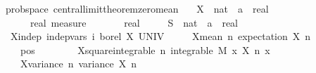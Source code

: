 \documentclass{article}
\begin{document}
\begin{boxB}
\begin{isabelle}
\isamarkupfalse \ {\isacharparenleft}{\kern0pt}\ prob{\isacharunderscore}{\kern0pt}space{\isacharparenright}{\kern0pt}\ central{\isacharunderscore}{\kern0pt}limit{\isacharunderscore}{\kern0pt}theorem{\isacharunderscore}{\kern0pt}zero{\isacharunderscore}{\kern0pt}mean{\isacharcolon}{\kern0pt}\isanewline
\ \ \ X\ {\isacharcolon}{\kern0pt}{\isacharcolon}{\kern0pt}\ {\isachardoublequoteopen}nat\ {\isasymRightarrow}\ {\isacharprime}{\kern0pt}a\ {\isasymRightarrow}\ real{\isachardoublequoteclose}\isanewline
\ \ \ \ \ {\isasymmu}\ {\isacharcolon}{\kern0pt}{\isacharcolon}{\kern0pt}\ {\isachardoublequoteopen}real\ measure{\isachardoublequoteclose}\isanewline
\ \ \ \ \ {\isasymsigma}\ {\isacharcolon}{\kern0pt}{\isacharcolon}{\kern0pt}\ real\isanewline
\ \ \ \ \ S\ {\isacharcolon}{\kern0pt}{\isacharcolon}{\kern0pt}\ {\isachardoublequoteopen}nat\ {\isasymRightarrow}\ {\isacharprime}{\kern0pt}a\ {\isasymRightarrow}\ real{\isachardoublequoteclose}\isanewline
\ \ \ X{\isacharunderscore}{\kern0pt}indep{\isacharcolon}{\kern0pt}\ {\isachardoublequoteopen}indep{\isacharunderscore}{\kern0pt}vars\ {\isacharparenleft}{\kern0pt}{\isasymlambda}i{\isachardot}{\kern0pt}\ borel{\isacharparenright}{\kern0pt}\ X\ UNIV{\isachardoublequoteclose}\isanewline
\ \ \ \ \ X{\isacharunderscore}{\kern0pt}mean{\isacharunderscore}{\kern0pt}{}{\isacharcolon}{\kern0pt}\ {\isachardoublequoteopen}{\isasymAnd}n{\isachardot}{\kern0pt}\ expectation\ {\isacharparenleft}{\kern0pt}X\ n{\isacharparenright}{\kern0pt}\ {\isacharequal}{\kern0pt}\ {}{\isachardoublequoteclose}\isanewline
\ \ \ \ \ {\isasymsigma}{\isacharunderscore}{\kern0pt}pos{\isacharcolon}{\kern0pt}\ {\isachardoublequoteopen}{\isasymsigma}\ {\isachargreater}{\kern0pt}\ {}{\isachardoublequoteclose}\isanewline
\ \ \ \ \ X{\isacharunderscore}{\kern0pt}square{\isacharunderscore}{\kern0pt}integrable{\isacharcolon}{\kern0pt}\ {\isachardoublequoteopen}{\isasymAnd}n{\isachardot}{\kern0pt}\ integrable\ M\ {\isacharparenleft}{\kern0pt}{\isasymlambda}x{\isachardot}{\kern0pt}\ {\isacharparenleft}{\kern0pt}X\ n\ x{\isacharparenright}{\kern0pt}\isanewline
\ \ \ \ \ X{\isacharunderscore}{\kern0pt}variance{\isacharcolon}{\kern0pt}\ {\isachardoublequoteopen}{\isasymAnd}n{\isachardot}{\kern0pt}\ variance\ {\isacharparenleft}{\kern0pt}X\ n{\isacharparenright}{\kern0pt}\ {\isacharequal}{\kern0pt}\ {\isasymsigma}\isanewline

\end{isabelle}
\end{boxB}
\end{document}
